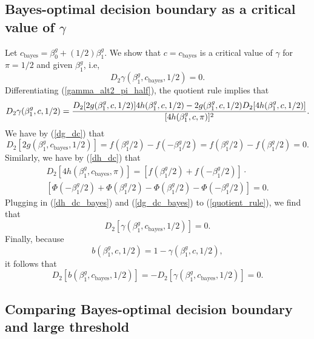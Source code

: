 \documentclass[12pt]{article}
\begin{document}
\begin{appendices}
\subsection{Bayes-optimal decision boundary as a critical value of $\gamma$}\label{sec:bayes_opt}
Let $c_\textrm{bayes} = \beta^g_0 + (1/2)\beta^g_1.$ We show that $c = c_\textrm{bayes}$ is a critical value of $\gamma$ for $\pi = 1/2$ and given $\beta^g_1$, i.e, $$D_2 \gamma (\beta^g_1, c_\textrm{bayes}, 1/2) = 0.$$ Differentiating (\ref{gamma_alt2_pi_half}), the quotient rule implies that
\begin{equation}\label{quotient_rule}
D_2\gamma(\beta^g_1, c, 1/2) \\ = \frac{D_2[2g(\beta^g_1, c, 1/2)] 4h(\beta^g_1, c, 1/2) - 2g(\beta^g_1, c, 1/2) D_2[4h(\beta^g_1, c, 1/2)]}{[4h(\beta^g_1, c, \pi)]^2}.
\end{equation}
We have by (\ref{dg_dc}) that
\begin{equation}\label{dg_dc_bayes}
D_2[2g(\beta^g_1, c_\textrm{bayes}, 1/2)] = f( \beta^g_1/2) - f( -\beta^g_1/2) = f(\beta^g_1/2) - f(\beta^g_1/2) = 0.
\end{equation}
Similarly, we have by (\ref{dh_dc}) that
\begin{multline}\label{dh_dc_bayes}
D_2[4 h(\beta^g_1, c_\textrm{bayes}, \pi)] = [f( \beta^g_1/2) + f( -\beta^g_1/2)] \cdot \\ \left[  \Phi(-\beta^g_1/2) + \Phi(\beta^g_1/2) -  \Phi(\beta^g_1/2) - \Phi(-\beta^g_1/2) \right] = 0.
\end{multline}
Plugging in (\ref{dh_dc_bayes}) and (\ref{dg_dc_bayes}) to (\ref{quotient_rule}), we find that 
$$D_2[\gamma(\beta^g_1, c_\textrm{bayes}, 1/2)] = 0.$$ Finally, because
$$b(\beta^g_1, c, 1/2) = 1 - \gamma(\beta^g_1, c, 1/2),$$ it follows that
$$D_2[b(\beta^g_1, c_\textrm{bayes}, 1/2)] = -D_2[\gamma(\beta^g_1, c_\textrm{bayes}, 1/2)] = 0.$$

\subsection{Comparing Bayes-optimal decision boundary and large threshold}\label{sec:comparison}


\end{appendices}
\end{document}
